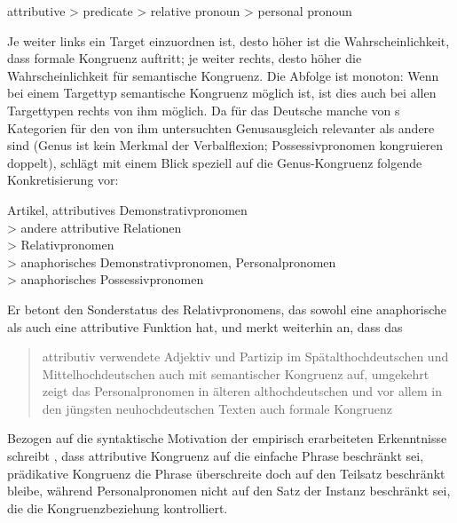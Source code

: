 \begin{exe}
\ex attributive > predicate > relative pronoun > personal pronoun
\end{exe}

Je weiter links ein Target einzuordnen ist, desto höher ist die
Wahrscheinlichkeit, dass formale Kongruenz auftritt; je weiter rechts, desto
höher die Wahrscheinlichkeit für semantische Kongruenz. Die Abfolge ist
monoton: Wenn bei einem Targettyp semantische Kongruenz möglich ist, ist dies
auch bei allen Targettypen rechts von ihm möglich. Da für das
Deutsche manche von \citeauthor{corbett1979}s Kategorien für
den von ihm untersuchten Genusausgleich relevanter als andere sind (Genus ist
kein Merkmal der Verbalflexion; Possessivpronomen kongruieren doppelt), schlägt
\citet[193]{fleischer2012} mit einem Blick speziell auf die Genus-Kongruenz
folgende Konkretisierung vor:

\begin{exe}
\ex Artikel, attributives Demonstrativpronomen \\
	\hspace*{1em} > andere attributive Relationen \\
	\hspace*{2em} > Relativpronomen \\
	\hspace*{3em} > anaphorisches Demonstrativpronomen, Personalpronomen \\
	\hspace*{4em} > anaphorisches Possessivpronomen
\end{exe}

Er betont den Sonderstatus des Relativpronomens, das sowohl eine anaphorische
als auch eine attributive Funktion hat, und merkt weiterhin an, dass das
\blockcquote[194]{fleischer2012}{attributiv verwendete
Adjektiv und Partizip \textelp{} im
Spätalthochdeutschen und
Mittelhochdeutschen auch mit semantischer Kongruenz
auf, umgekehrt zeigt das Personalpronomen in älteren
althochdeutschen und vor allem in den jüngsten
neuhochdeutschen Texten auch formale Kongruenz}.

Bezogen auf die syntaktische Motivation der empirisch erarbeiteten Erkenntnisse
schreibt \citet[216]{corbett1979}, dass attributive Kongruenz auf die einfache
Phrase beschränkt sei, prädikative Kongruenz die Phrase überschreite doch auf
den Teilsatz beschränkt bleibe, während Personalpronomen nicht auf den Satz der
Instanz beschränkt sei, die die Kongruenzbeziehung kontrolliert.

